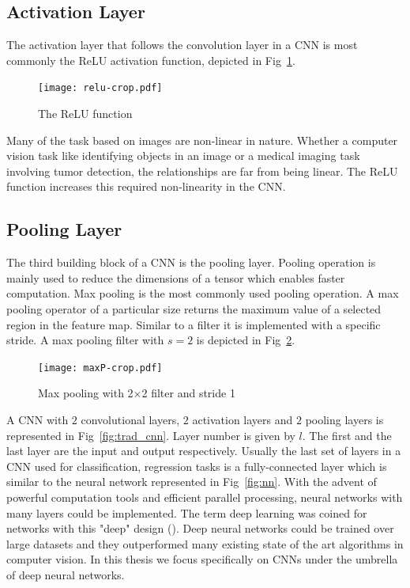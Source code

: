 \subsection{Activation Layer}

The activation layer that follows the convolution layer in a \ac{CNN} is most commonly the \ac{ReLU} activation function, depicted in Fig~\ref{fig:relu}.

\begin{figure}[!htbp]
	\centering
	\texttt{[image: relu-crop.pdf]}
	\caption{The \ac{ReLU} function}
	\label{fig:relu}
\end{figure}


Many of the task based on images are non-linear in nature. Whether a computer vision task like identifying objects in an image or a medical imaging task involving tumor detection, the relationships are far from being linear. The \ac{ReLU} function increases this required non-linearity in the \ac{CNN}. 

\subsection{Pooling Layer}

The third building block of a \ac{CNN} is the pooling layer. Pooling operation is mainly used to reduce the dimensions of a tensor which enables faster computation. Max pooling is the most commonly used pooling operation. A max pooling operator of a particular size returns the maximum value of a selected region in the feature map. Similar to a filter it is implemented with a specific stride. A max pooling filter with $s=2$ is depicted in Fig~\ref{fig:mp}.

\begin{figure}[!htbp]
	\centering
	\texttt{[image: maxP-crop.pdf]}
	\caption{Max pooling with 2$\times$2 filter and stride 1}
	\label{fig:mp}
\end{figure}


A \ac{CNN} with $2$ convolutional layers, $2$ activation layers and $2$ pooling layers is represented in Fig~\ref{fig:trad_cnn}. Layer number is given by $l$. The first and the last layer are the input and output respectively. Usually the last set of layers in a \ac{CNN} used for classification, regression tasks is a fully-connected layer which is similar to the neural network represented in Fig~\ref{fig:nn}. With the advent of powerful computation tools and efficient parallel processing, neural networks with many layers could be implemented. The term deep learning was coined for networks with this "deep" design (\cite{lecun2015deep}). Deep neural networks could be trained over large datasets and they outperformed many existing state of the art algorithms in computer vision. In this thesis we focus specifically on \ac{CNN}s under the umbrella of deep neural networks.  





